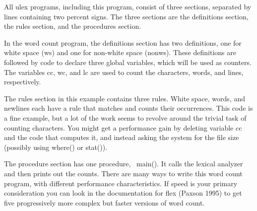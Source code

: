 
All \textsf{ulex} programs, including this program, consist of three
sections, separated by lines containing two percent signs. The three
sections are the definitions section, the rules section, and the
procedures section.

In the word count program, the definitions section has two definitions,
one for white space (\textsf{ws}) and one for non-white space
(\textsf{nonws}). These definitions are followed by code to declare
three global variables, which will be used as counters. The variables
\textsf{cc}, \textsf{wc}, and \textsf{lc} are used to count the
characters, words, and lines, respectively.

The rules section in this example contains three rules. White space,
words, and newlines each have a rule that matches and counts their
occurrences. This code is a fine example, but a lot of the work seems
to revolve around the trivial task of counting characters. You might
get a performance gain by deleting variable cc and the code that
computes it, and instead asking the system for the file size (possibly
using \textsf{where()} or \textsf{stat()}).

The procedure section has one procedure, \ \textsf{main()}. It calls the
lexical analyzer and then prints out the counts. There are many ways to
write this word count program, with different performance
characteristics. If speed is your primary consideration you can look in
the documentation for \textsf{flex} (Paxson 1995) to get five
progressively more complex but faster versions of word count.

